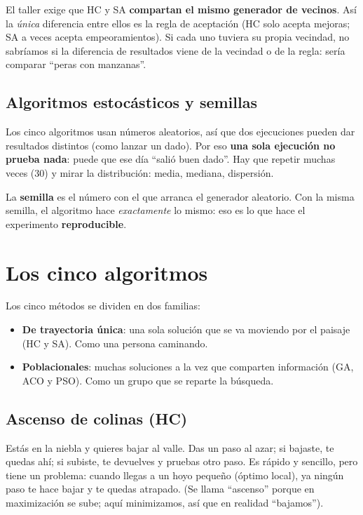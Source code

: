 \documentclass[11pt,a4paper]{article}
\begin{document}
\begin{porque}
El taller exige que HC y SA \textbf{compartan el mismo generador de vecinos}. Así la \emph{única} diferencia entre ellos es
la regla de aceptación (HC solo acepta mejoras; SA a veces acepta empeoramientos). Si cada uno tuviera su propia vecindad,
no sabríamos si la diferencia de resultados viene de la vecindad o de la regla: sería comparar ``peras con manzanas''.
\end{porque}

\subsection{Algoritmos estocásticos y semillas}

\begin{idea}
Los cinco algoritmos usan números aleatorios, así que dos ejecuciones pueden dar resultados distintos (como lanzar un dado).
Por eso \textbf{una sola ejecución no prueba nada}: puede que ese día ``salió buen dado''. Hay que repetir muchas veces (30)
y mirar la distribución: media, mediana, dispersión.

La \textbf{semilla} es el número con el que arranca el generador aleatorio. Con la misma semilla, el algoritmo hace
\emph{exactamente} lo mismo: eso es lo que hace el experimento \textbf{reproducible}.
\end{idea}

\section{Los cinco algoritmos}\label{sec:algoritmos}
Los cinco métodos se dividen en dos familias:
\begin{itemize}
  \item \textbf{De trayectoria única}: una sola solución que se va moviendo por el paisaje (HC y SA). Como una persona caminando.
  \item \textbf{Poblacionales}: muchas soluciones a la vez que comparten información (GA, ACO y PSO). Como un grupo que se reparte la búsqueda.
\end{itemize}

\subsection{Ascenso de colinas (HC)}
\begin{idea}
Estás en la niebla y quieres bajar al valle. Das un paso al azar; si bajaste, te quedas ahí; si subiste, te devuelves y pruebas otro paso.
Es rápido y sencillo, pero tiene un problema: cuando llegas a un hoyo pequeño (óptimo local), ya ningún paso te hace bajar y te quedas atrapado.
(Se llama ``ascenso'' porque en maximización se sube; aquí minimizamos, así que en realidad ``bajamos'').
\end{idea}
\end{document}
